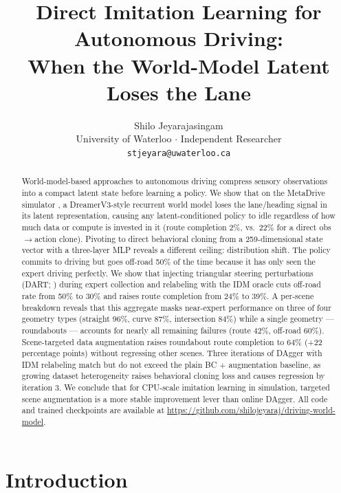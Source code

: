 \documentclass{article}
\title{Direct Imitation Learning for Autonomous Driving:\\
When the World-Model Latent Loses the Lane}
\author{
  Shilo Jeyarajasingam \\
  University of Waterloo $\cdot$ Independent Researcher \\
  \texttt{stjeyara@uwaterloo.ca}
}
\begin{document}
\maketitle

\begin{abstract}
World-model-based approaches to autonomous driving compress sensory
observations into a compact latent state before learning a policy.
We show that on the MetaDrive simulator \citep{li2022metadrive}, a
DreamerV3-style recurrent world model \citep{hafner2023dreamerv3}
loses the lane/heading signal in its latent representation, causing any
latent-conditioned policy to idle regardless of how much data or compute
is invested in it (route completion 2\%, vs.\ 22\% for a direct
obs$\to$action clone). Pivoting to direct behavioral cloning from a
259-dimensional state vector with a three-layer MLP reveals a different
ceiling: distribution shift. The policy commits to driving but goes
off-road 50\% of the time because it has only seen the expert driving
perfectly. We show that injecting triangular steering perturbations
(DART; \citealt{laskey2017dart}) during expert collection and relabeling
with the IDM oracle \citep{treiber2000idm} cuts off-road rate from 50\%
to 30\% and raises route completion from 24\% to 39\%. A per-scene
breakdown reveals that this aggregate masks near-expert performance on
three of four geometry types (straight 96\%, curve 87\%, intersection
84\%) while a single geometry --- roundabouts --- accounts for nearly all
remaining failures (route 42\%, off-road 60\%). Scene-targeted data
augmentation raises roundabout route completion to 64\% (+22 percentage
points) without regressing other scenes. Three iterations of DAgger with
IDM relabeling match but do not exceed the plain BC + augmentation
baseline, as growing dataset heterogeneity raises behavioral cloning loss
and causes regression by iteration 3. We conclude that for CPU-scale
imitation learning in simulation, targeted scene augmentation is a more
stable improvement lever than online DAgger. All code and trained
checkpoints are available at
\url{https://github.com/shilojeyaraj/driving-world-model}.
\end{abstract}

\section{Introduction}
\label{sec:intro}
\end{document}
